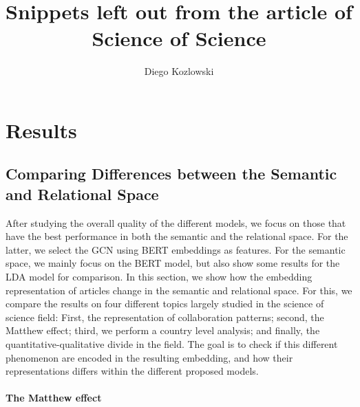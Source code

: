 \documentclass[smallextended]{svjour3}
\title{Snippets left out from the article of Science of Science}
\author{Diego Kozlowski}
\institute{}
\date{}
\begin{document}
	\maketitle
	\section{Results}
	\label{sec:Results}
	
\subsection{Comparing Differences between the Semantic and Relational Space}
	\label{sec:Differences}
	After studying the overall quality of the different models, we focus on those that have the best performance in both the semantic and the relational space. For the latter, we select the GCN using BERT embeddings as features. For the semantic space, we mainly focus on the BERT model, but also show some results for the LDA model for comparison. In this section, we show how the embedding representation of articles change in the semantic and relational space. For this, we compare the results on four different topics largely studied in the science of science field: First, the representation of collaboration patterns; second, the Matthew effect; third, we perform a country level analysis; and finally, the quantitative-qualitative divide in the field. The goal is to check if this different phenomenon are encoded in the resulting embedding, and how their representations differs within the different proposed models.

	
	\paragraph{\textbf{The Matthew effect}}
\end{document}
